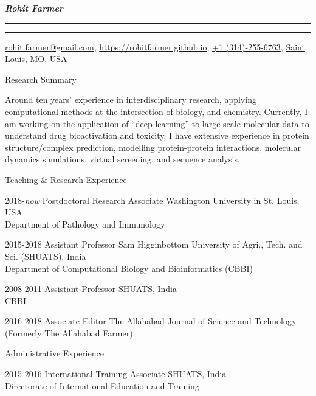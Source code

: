 \documentclass[10pt]{article}
\begin{document}
\settowidth{\cvlabelwidth}{%
\cvlabelfont 2009-2009%
}%
\begin{cv}{\huge \it \bfseries Rohit Farmer}
\vskip3pt
\hrule\hrule
\vskip3pt
\hfill \url{rohit.farmer@gmail.com},  \url{https://rohitfarmer.github.io}, \url{+1 (314)-255-6763}, \url{Saint} \url{Louis, MO, USA}

{
\setlength{\cvlabelsep}{0mm}
\setlength{\cvlabelwidth}{0mm}
\begin{cvlist}{Research Summary}
	\item Around ten years' experience   in   interdisciplinary   research,   applying   computational   methods   at   the intersection of biology, and chemistry. Currently, I  am  working  on the application of  “deep learning”   to large-scale molecular data to understand drug bioactivation and toxicity.   I   have   extensive   experience   in   protein   structure/complex prediction, modelling protein-protein interactions, molecular dynamics simulations, virtual screening, and sequence analysis.
\end{cvlist}
}

\begin{cvlist}{Teaching \& Research Experience}
	\item[2018-\emph{now}] Postdoctoral Research Associate \hfill Washington University in St. Louis, USA\\  \hspace*{\fill} Department of Pathology and Immunology
	\item[2015-2018] Assistant Professor \hfill Sam Higginbottom University of Agri., Tech. and Sci. (SHUATS), India\\  \hspace*{\fill} Department of Computational Biology and Bioinformatics (CBBI)
	\item[2008-2011] Assistant Professor \hfill SHUATS, India\\  \hspace*{\fill} CBBI
	\item[2016-2018] Associate Editor \hfill The Allahabad Journal of Science and Technology \\  \hspace*{\fill} (Formerly The Allahabad Farmer)
\end{cvlist}

\begin{cvlist}{Administrative Experience}
	\item[2015-2016] International Training Associate \hfill SHUATS, India \\  \hspace*{\fill} Directorate of International Education and Training
\end{cvlist}


\end{cv}
\end{document}
